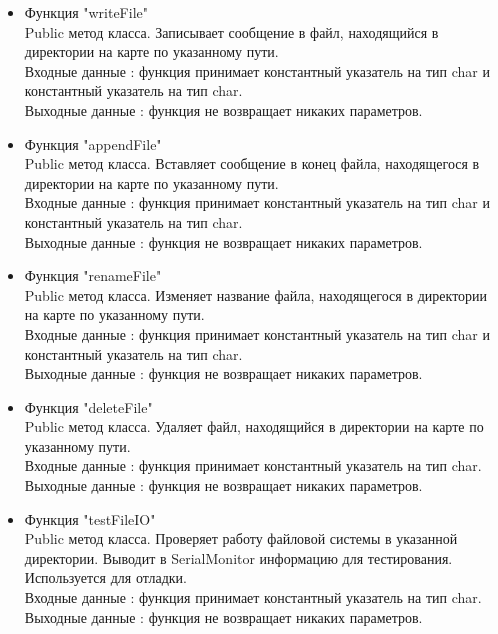 \documentclass[a4document]{article}
\begin{document}
{\begin{itemize}
\begin{itemize}
                Выходные данные : функция не возвращает никаких параметров.
            \item Функция "writeFile" \\
                Public метод класса. Записывает сообщение в файл, находящийся в директории на карте по указанному пути.\\ 
                Входные данные : функция принимает константный указатель на тип char и константный указатель на тип char.\\
                Выходные данные : функция не возвращает никаких параметров.
            \item Функция "appendFile" \\
                Public метод класса. Вставляет сообщение в конец файла, находящегося в директории на карте по указанному пути.\\ 
                Входные данные : функция принимает константный указатель на тип char и константный указатель на тип char.\\
                Выходные данные : функция не возвращает никаких параметров.
            \newpage
            \item Функция "renameFile" \\
                Public метод класса. Изменяет название файла, находящегося в директории на карте по указанному пути. \\ 
                Входные данные : функция принимает константный указатель на тип char и константный указатель на тип char.\\
                Выходные данные : функция не возвращает никаких параметров.
          
            \item Функция "deleteFile" \\
                Public метод класса. Удаляет файл, находящийся в директории на карте по указанному пути.\\ 
                Входные данные : функция принимает константный указатель на тип char.\\
                Выходные данные : функция не возвращает никаких параметров.
            \item Функция "testFileIO" \\
                Public метод класса. Проверяет работу файловой системы в указанной директории. 
                Выводит в SerialMonitor информацию для тестирования. Используется для отладки.\\
                Входные данные : функция принимает константный указатель на тип char.\\
                Выходные данные : функция не возвращает никаких параметров.
        \end{itemize}
                

\end{itemize}}
\end{document}
